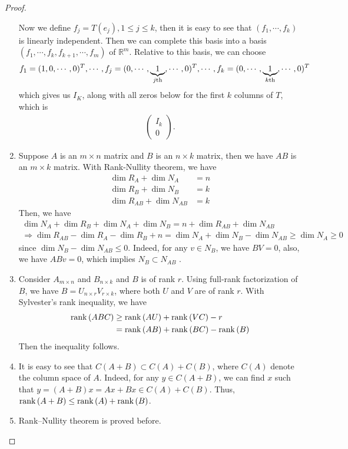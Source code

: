 \documentclass[11pt]{book}
\theoremstyle{definition}
\numberwithin{equation}{subsection}
\begin{document}
\begin{proof}
\begin{enumerate}[label=(\arabic*)]
    Now we define $f_j = T(e_j), 1\leq j\leq k$, then it is easy to see that $(f_1, \cdots, f_k)$ is linearly independent. Then we can complete this basis into a basis $(f_1, \cdots, f_k,f_{k+1},\cdots,f_m)$ of $\mathbb{R}^m$. Relative to this basis, we can choose $$f_1 = (1,0,\cdots, 0)^T, \cdots, f_j = (0,\cdots,\underbrace{1}_{j {\rm th}}, \cdots, 0)^T, \cdots, f_k = (0,\cdots,\underbrace{1}_{k {\rm th}}, \cdots, 0)^T$$
    which gives us $I_K$, along with all zeros below for the first $k$ columns of $T$, which is \cite{3}
    \begin{align*}
        \left(
        \begin{matrix}
        I_{k} \\
        0
        \end{matrix}
        \right).
    \end{align*}
    \item Suppose $A$ is an $m\times n$ matrix and $B$ is an $n\times k$ matrix, then we have $AB$ is an $m\times k$ matrix. With Rank-Nullity theorem, we have 
    \begin{align*}
        \dim R_A + \dim N_A & = n \\
        \dim R_B + \dim N_B & = k \\
        \dim R_{AB} + \dim N_{AB} & = k
    \end{align*}
    Then, we have
    \begin{align*}
        \dim N_A + \dim R_B + \dim N_A + \dim N_B = n + \dim R_{AB} + \dim N_{AB} \\
        \Rightarrow \dim R_{AB} - \dim R_A - \dim R_B + n = \dim N_A + \dim N_B - \dim N_{AB} \geq \dim N_A \geq 0
    \end{align*}
    since $\dim N_B - \dim N_{AB}\leq 0$. Indeed, for any $v\in N_B$, we have $BV = 0$, also, we have $ABv = 0$, which implies $N_B\subset N_{AB}$ \cite{4}. 
    \item Consider $A_{m\times n}$ and $B_{n\times k}$ and $B$ is of rank $r$. Using full-rank factorization of $B$, we have $B = U_{n\times r}V_{r\times k}$, where both $U$ and $V$ are of rank $r$\cite{7}\cite{5}. With Sylvester’s rank inequality, we have
    \begin{align*}
        {\rm rank}\, (ABC) & \geq {\rm rank}\, (AU) + {\rm rank}\, (VC) - r\\
        & = {\rm rank}\, (AB) + {\rm rank}\, (BC) - {\rm rank}\, (B)
    \end{align*}
    Then the inequality follows\cite{6}.
    \item It is easy to see that $C(A+B)\subset C(A)+C(B)$, where $C(A)$ denote the column space of $A$. Indeed, for any $y\in C(A+B)$, we can find $x$ such that $y = (A+B)x = Ax + Bx\in C(A)+C(B)$. Thus, ${\rm rank}\, (A+B)\leq {\rm rank}\, (A)+{\rm rank}\, (B)$.
    \item Rank–Nullity theorem is proved before.
\end{enumerate}
\end{proof}
\end{document}
